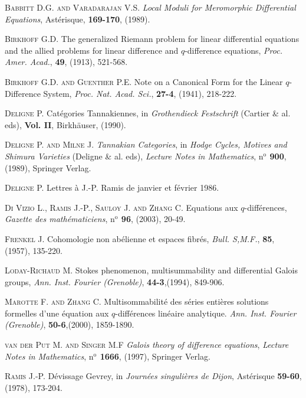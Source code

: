 \documentclass[english]{smfart}
\numberwithin{equation}{thm}
\begin{document}
\begin{thebibliography}{}

 \textsc{Babbitt D.G. and Varadarajan V.S.}
\emph{Local Moduli for Meromorphic Differential Equations},
Ast\'erisque, {\bf 169-170}, (1989).

 \textsc{Birkhoff G.D.}
The generalized Riemann problem for linear differential equations and the
allied problems for linear difference and  $q$-difference
equations, \emph{Proc. Amer. Acad.}, {\bf 49}, (1913), 521-568.

 \textsc{Birkhoff G.D. and Guenther P.E.}
Note on a Canonical Form for the Linear $q$-Difference System,
\emph{Proc. Nat. Acad. Sci.}, {\bf 27-4}, (1941), 218-222.

 \textsc{Deligne P.}
Cat\'egories Tannakiennes,
in \emph{Grothendieck Festschrift} (Cartier \& al. eds),
{\bf Vol. II},  Birkh\"{a}user, (1990).

 \textsc{Deligne P. and Milne J.}
\emph{Tannakian Categories},
in \emph{Hodge Cycles, Motives and Shimura Varieties} (Deligne \& al. eds),
\emph{Lecture Notes in Mathematics}, {\bf
$\text{n}^{\text{o}}$ 900}, (1989), Springer Verlag.

 \textsc{Deligne P.}
Lettres \`a J.-P. Ramis de janvier et f\'evrier 1986.

\textsc{Di Vizio L., Ramis J.-P., Sauloy J. and Zhang C.}
Equations aux $q$-diff\'erences,
\emph{Gazette des math\'ematiciens}, {\bf $\text{n}^{\text{o}}$
96}, (2003), 20-49.

 \textsc{Frenkel J.}
Cohomologie non ab\'elienne et espaces fibr\'es,
\emph{Bull. S,M.F.}, {\bf 85}, (1957), 135-220.

 \textsc{Loday-Richaud M.}
Stokes phenomenon, multisummability and differential Galois groups,
\emph{Ann. Inst. Fourier (Grenoble)}, {\bf 44-3},(1994), 849-906.

 \textsc{Marotte F. and Zhang C.}
Multisommabilit\'e des s\'eries enti\`eres solutions formelles d'une
\'equation aux {$q$}-diff\'erences lin\'eaire analytique.
\emph{Ann. Inst. Fourier (Grenoble)}, {\bf 50-6},(2000),
1859-1890.

 \textsc{van der Put M. and Singer M.F}
\emph{Galois theory of difference equations},
\emph{Lecture Notes in Mathematics}, {\bf $\text{n}^{\text{o}}$
1666}, (1997), Springer Verlag.

 \textsc{Ramis J.-P.}
D\'evissage Gevrey, in \emph{Journ\'ees singuli\`eres de Dijon},
Ast\'erisque {\bf 59-60}, (1978), 173-204.


\end{thebibliography}
\end{document}
